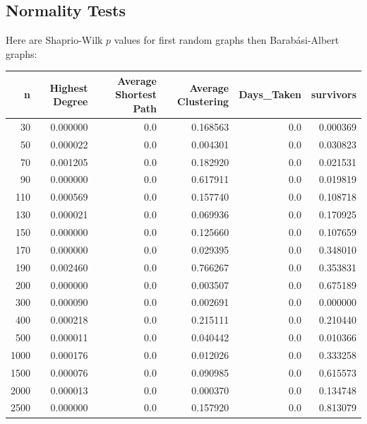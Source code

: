 \documentclass{article}
\begin{document}
        \subsection{Normality Tests}
        Here are Shaprio-Wilk $p$ values for first random graphs then Barabási-Albert graphs:
        \begin{tabular}{rrrrrr}
            \toprule
               n &  Highest Degree &  Average Shortest Path &  Average Clustering &  Days\_Taken &  survivors \\
            \midrule
              30 &        0.000000 &                    0.0 &            0.168563 &         0.0 &   0.000369 \\
              50 &        0.000022 &                    0.0 &            0.004301 &         0.0 &   0.030823 \\
              70 &        0.001205 &                    0.0 &            0.182920 &         0.0 &   0.021531 \\
              90 &        0.000000 &                    0.0 &            0.617911 &         0.0 &   0.019819 \\
             110 &        0.000569 &                    0.0 &            0.157740 &         0.0 &   0.108718 \\
             130 &        0.000021 &                    0.0 &            0.069936 &         0.0 &   0.170925 \\
             150 &        0.000000 &                    0.0 &            0.125660 &         0.0 &   0.107659 \\
             170 &        0.000000 &                    0.0 &            0.029395 &         0.0 &   0.348010 \\
             190 &        0.002460 &                    0.0 &            0.766267 &         0.0 &   0.353831 \\
             200 &        0.000000 &                    0.0 &            0.003507 &         0.0 &   0.675189 \\
             300 &        0.000090 &                    0.0 &            0.002691 &         0.0 &   0.000000 \\
             400 &        0.000218 &                    0.0 &            0.215111 &         0.0 &   0.210440 \\
             500 &        0.000011 &                    0.0 &            0.040442 &         0.0 &   0.010366 \\
            1000 &        0.000176 &                    0.0 &            0.012026 &         0.0 &   0.333258 \\
            1500 &        0.000076 &                    0.0 &            0.090985 &         0.0 &   0.615573 \\
            2000 &        0.000013 &                    0.0 &            0.000370 &         0.0 &   0.134748 \\
            2500 &        0.000000 &                    0.0 &            0.157920 &         0.0 &   0.813079 \\
            \bottomrule
            \end{tabular}
\end{document}
